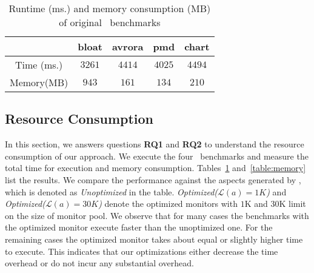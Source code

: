 \begin{table*}[!ht]
\begin{tabular}{|c|c|c|c|c|c|c||c|c|c|c|c|c|c|c|}
 

\end{tabular}
\caption{Comparison of event times(ms) of \dacapo\ \bloat.}
\label{table:eventTime}
\end{table*}






\begin{table}[b]
\centering
\small
\begin{tabular}{|c|c|c|c|c|}
\hline    

&\textbf{bloat} & \textbf{avrora} & \textbf{pmd} & \textbf{chart} \\\hline
Time (ms.) & $3261$ & $4414$ & $4025$ & $4494$\\\hline
Memory(MB) & $943$ & $161$ & $134$ & $210$\\\hline 
\end{tabular}
\caption{Runtime (ms.) and memory consumption (MB) of original \dacapo\
benchmarks}
\label{table:time}
\end{table}

\subsection{Resource Consumption}
\label{sec:evaluation:resource}


In this section, we answers questions \textbf{RQ1} and \textbf{RQ2} to 
understand the resource consumption of our approach. We execute the four 
\dacapo\ benchmarks and measure the total time for execution and memory 
consumption. Tables~\ref{table:time} and~\ref{table:memory} list the results.
We compare the performance against the aspects generated by \javamop, which is 
denoted as \emph{Unoptimized} in the table. \emph{Optimized($\mathcal{L}(a) = 1K$)} 
and \emph{Optimized($\mathcal{L}(a) = 30K$)} denote the optimized monitors with 
$1$K and $30$K limit on the size of monitor pool. We observe that for many cases 
the benchmarks with the optimized monitor execute faster than the unoptimized one.
For the remaining cases the optimized monitor takes  about equal or slightly higher
time to execute. This indicates that
our optimizations either decrease the time overhead or do not incur any substantial
overhead. 

